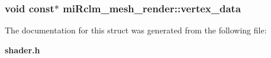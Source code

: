 \subsubsection{\setlength{\rightskip}{0pt plus 5cm}void const$\ast$ {\bf mi\-Rclm\_\-mesh\_\-render::vertex\_\-data}}\label{structmiRclm__mesh__render_o3}




The documentation for this struct was generated from the following file:\begin{CompactItemize}
\item 
{\bf shader.h}\end{CompactItemize}
